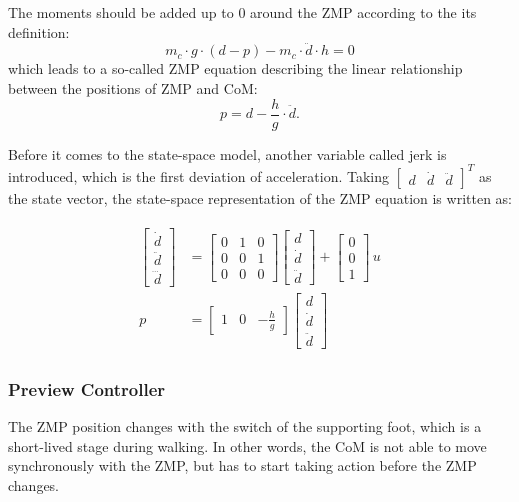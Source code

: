 The moments should be added up to $ 0 $ around the ZMP according to the its definition: 
\begin{equation}
	m_c\cdot g\cdot(d-p) - m_c\cdot\ddot{d}\cdot h = 0
\end{equation}
which leads to a so-called ZMP equation describing the linear relationship between the positions of ZMP and CoM:
\begin{equation}
p = d-\frac{h}{g}\cdot\ddot{d}.
\end{equation} 



Before it comes to the state-space model, another variable called jerk is introduced, which is the first deviation of acceleration. Taking $ \begin{bmatrix}
d&\dot{d}&\ddot{d}
\end{bmatrix}^T $ as the state vector, the state-space representation of the ZMP equation is written as:

\begin{align}
\label{zmpeuqation}
\begin{split}
\begin{bmatrix}
\dot{d}\\\ddot{d}\\\dddot{d}
\end{bmatrix}
&=
\begin{bmatrix}
0&1&0\\0&0&1\\0&0&0
\end{bmatrix}
\begin{bmatrix}
d\\\dot{d}\\\ddot{d}
\end{bmatrix}+
\begin{bmatrix}
0\\0\\1
\end{bmatrix}\,u\\
p&=
\begin{bmatrix}
1&0&-\frac{h}{g}
\end{bmatrix}
\begin{bmatrix}
d\\\dot{d}\\\ddot{d}
\end{bmatrix}
\end{split}
\end{align}

\subsubsection{Preview Controller}
The ZMP position changes with the switch of the supporting foot, which is a short-lived stage during walking. In other words, the CoM is not able to move synchronously with the ZMP, but has to start taking action before the ZMP changes.

